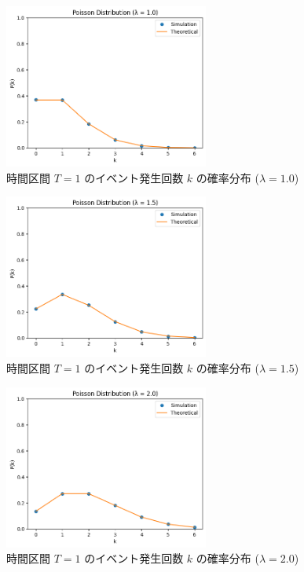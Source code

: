 \documentclass[fleqn, a4paper. 12pt]{jsarticle}
\begin{document}
      \begin{figure}[!h]
        \centering
        \includegraphics[width=0.6\textwidth]{5.png}
        \caption{時間区間 $T = 1$ のイベント発生回数 $k$ の確率分布 ($\lambda = 1.0$)}
        \label{fig:5}
      \end{figure}

      \begin{figure}[!h]
        \centering
        \includegraphics[width=0.6\textwidth]{6.png}
        \caption{時間区間 $T = 1$ のイベント発生回数 $k$ の確率分布 ($\lambda = 1.5$)}
        \label{fig:6}
      \end{figure}

      \begin{figure}[!h]
        \centering
        \includegraphics[width=0.6\textwidth]{7.png}
        \caption{時間区間 $T = 1$ のイベント発生回数 $k$ の確率分布 ($\lambda = 2.0$)}
        \label{fig:7}
      \end{figure}
\end{document}
